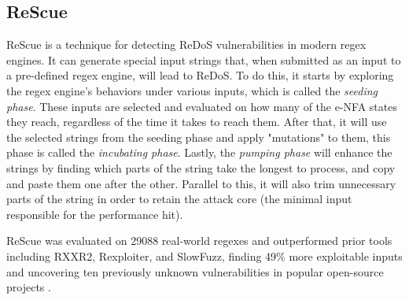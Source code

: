 
\subsection{ReScue}

ReScue is a technique for detecting ReDoS vulnerabilities in modern regex engines. It can generate special input strings that, when submitted as an input to a pre-defined regex engine, will lead to ReDoS. To do this, it starts by exploring the regex engine's behaviors under various inputs, which is called the \textit{seeding phase}. These inputs are selected and evaluated on how many of the e-NFA states they reach, regardless of the time it takes to reach them. After that, it will use the selected strings from the seeding phase and apply "mutations" to them, this phase is called the \textit{incubating phase}. Lastly, the \textit{pumping phase} will enhance the strings by finding which parts of the string take the longest to process, and copy and paste them one after the other. Parallel to this, it will also trim unnecessary parts of the string in order to retain the attack core (the minimal input responsible for the performance hit). \cite{rescue_paper}

ReScue was evaluated on 29088 real-world regexes and outperformed prior tools including RXXR2, Rexploiter, and SlowFuzz, finding 49\% more exploitable inputs and uncovering ten previously unknown vulnerabilities in popular open-source projects \cite{rescue_paper}.


